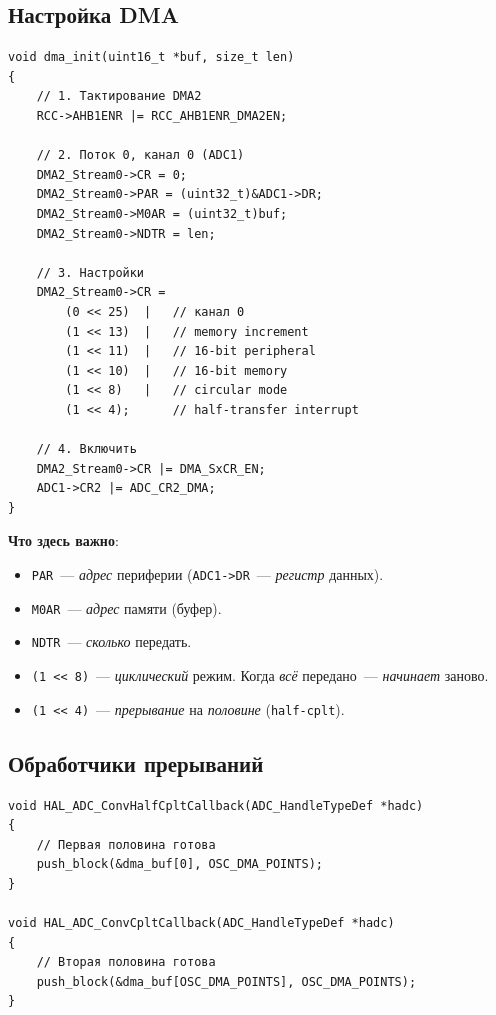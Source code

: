 \subsection{Настройка DMA}

\begin{listing}[htbp]
\begin{verbatim}
void dma_init(uint16_t *buf, size_t len)
{
    // 1. Тактирование DMA2
    RCC->AHB1ENR |= RCC_AHB1ENR_DMA2EN;

    // 2. Поток 0, канал 0 (ADC1)
    DMA2_Stream0->CR = 0;
    DMA2_Stream0->PAR = (uint32_t)&ADC1->DR;
    DMA2_Stream0->M0AR = (uint32_t)buf;
    DMA2_Stream0->NDTR = len;

    // 3. Настройки
    DMA2_Stream0->CR =
        (0 << 25)  |   // канал 0
        (1 << 13)  |   // memory increment
        (1 << 11)  |   // 16-bit peripheral
        (1 << 10)  |   // 16-bit memory
        (1 << 8)   |   // circular mode
        (1 << 4);      // half-transfer interrupt

    // 4. Включить
    DMA2_Stream0->CR |= DMA_SxCR_EN;
    ADC1->CR2 |= ADC_CR2_DMA;
}
\end{verbatim}
\caption{\texttt{dma\_init()}~--- настройка DMA}
\label{lst:dma-init}
\end{listing}

\textbf{Что здесь важно}:
\begin{itemize}
    \item \texttt{PAR}~--- \emph{адрес} периферии
          (\texttt{ADC1->DR}~--- \emph{регистр} данных).
    \item \texttt{M0AR}~--- \emph{адрес} памяти (буфер).
    \item \texttt{NDTR}~--- \emph{сколько} передать.
    \item \texttt{(1 << 8)}~--- \emph{циклический} режим.
          Когда \emph{всё} передано~--- \emph{начинает}
          заново.
    \item \texttt{(1 << 4)}~--- \emph{прерывание} на
          \emph{половине} (\texttt{half-cplt}).
\end{itemize}

\subsection{Обработчики прерываний}

\begin{listing}[htbp]
\begin{verbatim}
void HAL_ADC_ConvHalfCpltCallback(ADC_HandleTypeDef *hadc)
{
    // Первая половина готова
    push_block(&dma_buf[0], OSC_DMA_POINTS);
}

void HAL_ADC_ConvCpltCallback(ADC_HandleTypeDef *hadc)
{
    // Вторая половина готова
    push_block(&dma_buf[OSC_DMA_POINTS], OSC_DMA_POINTS);
}
\end{verbatim}
\caption{Обработчики прерываний DMA}
\label{lst:dma-irq}
\end{listing}

